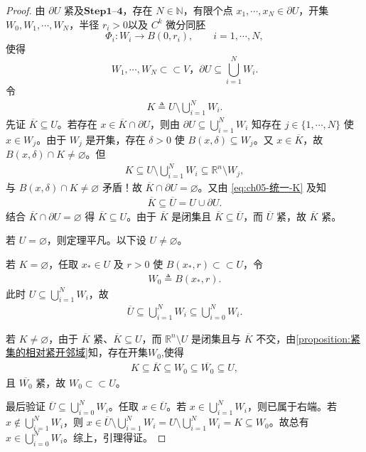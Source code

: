 \documentclass[../../main.tex]{subfiles}
\begin{document}
\begin{proof}
由 $\partial U$ 紧及$\mathbf{Step}\bm{1}$--$\bm{4}$，存在 $N\in\mathbb{N}$，有限个点 $x_1,\cdots,x_N\in\partial U$，开集 $W_0,W_1,\cdots,W_N$，半径 $r_i>0$以及 $C^{k}$ 微分同胚
\[
\Phi_i:W_i\longrightarrow B(0,r_i),
\qquad i=1,\cdots,N,
\]
使得
\[
W_1,\cdots,W_N\subset\subset V，\partial U\subseteq\bigcup_{i=1}^{N}W_i.
\]
令
\begin{align}
K\triangleq U\setminus\bigcup_{i=1}^{N}W_i.
\label{eq:ch05-统一-K}
\end{align}
先证 $\overline{K}\subseteq U$。若存在 $x\in\overline{K}\cap\partial U$，则由 $\partial U\subseteq\bigcup_{i=1}^{N}W_i$ 知存在 $j\in\{1,\cdots,N\}$ 使 $x\in W_j$。由于 $W_j$ 是开集，存在 $\delta>0$ 使 $B(x,\delta)\subseteq W_j$。又 $x\in\overline{K}$，故 $B(x,\delta)\cap K\neq\varnothing$。但
\begin{align*}
K\subseteq U\setminus\bigcup_{i=1}^{N}W_i\subseteq\mathbb{R}^{n}\setminus W_j,
\end{align*}
与 $B(x,\delta)\cap K\neq\varnothing$ 矛盾！故 $\overline{K}\cap\partial U=\varnothing$。又由 \eqref{eq:ch05-统一-K} 及知
\begin{align*}
\overline{K}\subseteq\overline{U}=U\cup\partial U.
\end{align*}
结合 $\overline{K}\cap\partial U=\varnothing$ 得 $\overline{K}\subseteq U$。由于 $\overline{K}$ 是闭集且 $\overline{K}\subseteq\overline{U}$，而 $\overline{U}$ 紧，故 $\overline{K}$ 紧。

若 $U=\varnothing$，则定理平凡。以下设 $U\neq\varnothing$。

若 $K=\varnothing$，任取 $x_*\in U$ 及 $r>0$ 使 $B(x_*,r)\subset\subset U$，令
\begin{align*}
W_0\triangleq B(x_*,r).
\end{align*}
此时 $U\subseteq\bigcup_{i=1}^{N}W_i$，故
\begin{align*}
\overline{U}\subseteq\bigcup_{i=1}^{N}W_i\subseteq\bigcup_{i=0}^{N}W_i.
\end{align*}

若 $K\neq\varnothing$，由于 $\overline{K}$ 紧、$\overline{K}\subseteq U$，而 $\mathbb{R}^{n}\setminus U$ 是闭集且与 $\overline{K}$ 不交，由\cref{proposition:紧集的相对紧开邻域}知，存在开集$W_0$,使得
\begin{align*}
K\subseteq\overline{K}\subseteq W_0\subseteq\overline{W_0}\subseteq U,
\end{align*}
且 $\overline{W_0}$ 紧，故 $W_0\subset\subset U$。

最后验证 $\overline{U}\subseteq\bigcup_{i=0}^{N}W_i$。任取 $x\in\overline{U}$。若 $x\in\bigcup_{i=1}^{N}W_i$，则已属于右端。若 $x\notin\bigcup_{i=1}^{N}W_i$，则 $x\in\overline{U}\setminus\bigcup_{i=1}^{N}W_i=U\setminus\bigcup_{i=1}^{N}W_i=K\subseteq W_0$。故总有 $x\in\bigcup_{i=0}^{N}W_i$。综上，引理得证。
\end{proof}
\end{document}
